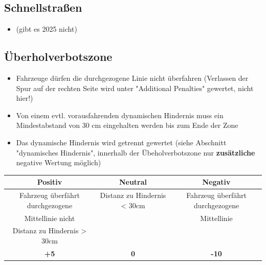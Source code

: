 \documentclass[a4paper, 11pt,usegeometry]{scrartcl}
\begin{document}
\subsection*{Schnellstraßen}
\begin{itemize}
 \item (gibt es 2025 nicht)
\end{itemize}

\subsection*{Überholverbotszone}
\begin{itemize}
 \item Fahrzeuge dürfen die durchgezogene Linie nicht überfahren
(Verlassen der Spur auf der rechten Seite wird unter "Additional Penalties" gewertet, nicht hier!)
 \item Von einem evtl. vorausfahrenden dynamischen Hindernis muss ein Mindestabstand von 30 cm eingehalten werden bis zum Ende der Zone
 \item Das dynamische Hindernis wird getrennt gewertet (siehe Abschnitt "dynamisches Hindernis",
 innerhalb der Übeholverbotszone nur \textbf{zusätzliche} negative Wertung möglich)
\end{itemize}
\begin{table}[H]
\begin{tabular}{|c|c|c|}
\hline
\rowcolor[HTML]{CACACA} 
\textbf{Positiv} & \textbf{Neutral} & \textbf{Negativ} \\ \hline
Fahrzeug überfährt durchgezogene & Distanz zu Hindernis < 30cm & Fahrzeug überfährt durchgezogene \\
Mittellinie nicht &  & Mittellinie \\ \hline
Distanz zu Hindernis > 30cm &  & \\ \hline
\textbf{+5} & \textbf{0} & \textbf{-10} \\ \hline
\end{tabular}
\end{table}
\end{document}
